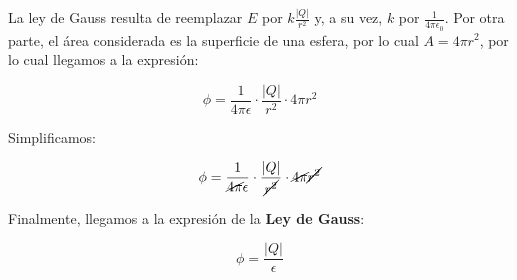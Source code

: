 La ley de Gauss resulta de reemplazar \(E\) por \(k\frac{|Q|}{r^{2}}\) y,
a su vez,
\(k\) por \(\frac{1}{4\pi\epsilon_0}\).
Por otra parte,
el área considerada es la superficie de una esfera,
por lo cual \(A = 4\pi r^{2}\),
por lo cual llegamos a la expresión:

\vspace{1cm}
\begin{equation*}
    \phi = \frac{1}{4\pi\epsilon} \cdot \frac{|Q|}{r^{2}} \cdot 4\pi r^{2}
\end{equation*}
\vspace{1cm}

Simplificamos:

\vspace{1cm}
\begin{equation*}
    \phi = \frac{1}{\cancel{4\pi}\epsilon} \cdot \frac{|Q|}{\cancel{r^{2}}} \cdot \cancel{4\pi} \cancel{r^{2}}
\end{equation*}
\vspace{1cm}

Finalmente, llegamos a la expresión de la \textbf{Ley de Gauss}:

\vspace{1cm}
\begin{equation}
    \phi = \frac{|Q|}{\epsilon}
\end{equation}
\vspace{1cm}

